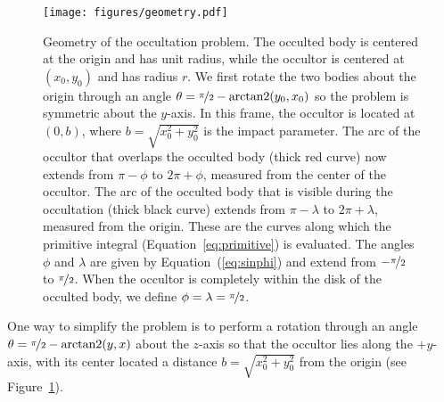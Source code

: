 \documentclass[modern]{aastex61}
\begin{document}
%
%
\begin{figure}[p!]
    \begin{centering}
    \texttt{[image: figures/geometry.pdf]}
    \caption{\label{fig:geometry}
             Geometry of the occultation problem.
             The occulted body is centered
             at the origin and has unit radius, while the occultor
             is centered at $(x_0, y_0)$ and has radius $r$. We first rotate
             the two bodies about the origin through an angle
             $\theta = \nicefrac{\pi}{2} - \mathrm{arctan2}(y_0, x_0)$
             so the problem is symmetric about the $y$-axis. In this frame,
             the occultor is located at $(0, b)$, where
             $b = \sqrt{x_0^2 + y_0^2}$ is the impact parameter.
             The arc of the occultor
             that overlaps the occulted body (thick red curve) now extends from
             $\pi - \phi$ to $2\pi + \phi$, measured from the center of the
             occultor.
             The arc of the occulted body that is visible during
             the occultation (thick black curve) extends from
             $\pi - \lambda$ to $2\pi + \lambda$, measured from the origin.
             These are the curves along which the primitive integral
             (Equation~\ref{eq:primitive}) is evaluated.
             The angles $\phi$ and $\lambda$ are given by
             Equation~(\ref{eq:sinphi})
             and extend from $-\nicefrac{\pi}{2}$ to $\nicefrac{\pi}{2}$. When
             the occultor is completely within the disk of the occulted body,
             we define $\phi = \lambda = \nicefrac{\pi}{2}$.
             }
    \end{centering}
\end{figure}
%
%

One way to simplify the problem is to perform a
rotation through an angle $\theta = \nicefrac{\pi}{2} - \mathrm{arctan2}(y, x)$
about the $z$-axis so that the occultor lies along the $+y$-axis,
with its center located a distance $b = \sqrt{x_0^2 + y_0^2}$ from the origin
(see Figure~\ref{fig:geometry}).

\citet{MandelAgol2002}


\end{document}
